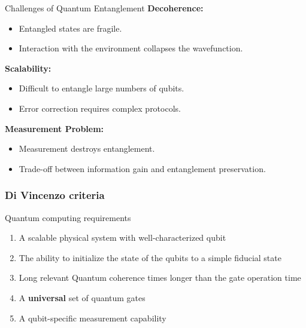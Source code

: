 \documentclass{beamer}
\begin{document}
\begin{frame}{Challenges of Quantum Entanglement}
\textbf{Decoherence:}
\begin{itemize}
    \item Entangled states are fragile.
    \item Interaction with the environment collapses the wavefunction.
\end{itemize}

\textbf{Scalability:}
\begin{itemize}
    \item Difficult to entangle large numbers of qubits.
    \item Error correction requires complex protocols.
\end{itemize}

\textbf{Measurement Problem:}
\begin{itemize}
    \item Measurement destroys entanglement.
    \item Trade-off between information gain and entanglement preservation.
\end{itemize}
\end{frame}


\begin{frame}
\frametitle{Di Vincenzo criteria}

\begin{alertblock}{Quantum computing requirements }
\begin{enumerate}
\item A scalable physical system with well-characterized qubit

\item The ability to initialize the state of the qubits to a simple fiducial state

\item Long relevant Quantum coherence times longer than the gate operation time

\item A \textbf{universal} set of quantum gates

\item A qubit-specific measurement capability
\end{enumerate}

\noindent
\end{alertblock}
\end{frame}
\end{document}
